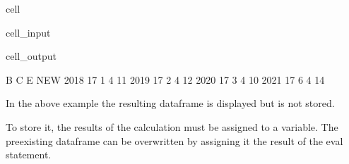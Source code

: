 \documentclass[letterpaper,10pt,english]{jupyterBook}
\begin{document}
\begin{sphinxuseclass}{cell}\begin{sphinxVerbatimInput}

\begin{sphinxuseclass}{cell_input}
\begin{sphinxVerbatim}[commandchars=\\\{\}]
\end{sphinxVerbatim}

\end{sphinxuseclass}\end{sphinxVerbatimInput}
\begin{sphinxVerbatimOutput}

\begin{sphinxuseclass}{cell_output}
\begin{sphinxVerbatim}[commandchars=\\\{\}]
       B  C  E  NEW
2018  17  1  4   11
2019  17  2  4   12
2020  17  3  4   10
2021  17  6  4   14
\end{sphinxVerbatim}

\end{sphinxuseclass}\end{sphinxVerbatimOutput}

\end{sphinxuseclass}
\sphinxAtStartPar
In the above example the resulting dataframe is displayed but is not stored.

\sphinxAtStartPar
To store it, the results of the calculation must be assigned to a variable.  The pre\sphinxhyphen{}existing dataframe can be overwritten by assigning it the result of the eval statement.
\end{document}
